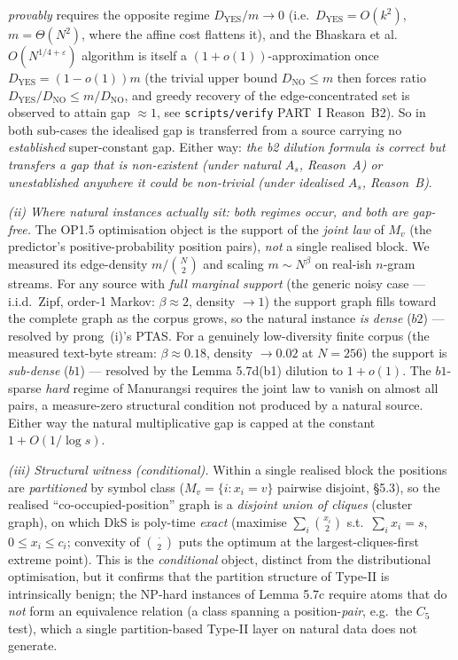 \documentclass[
]{article}
\begin{document}
\emph{provably} requires the opposite regime $D_{\mathrm{YES}}/m \to 0$ (i.e.\
$D_{\mathrm{YES}} = O(k^2)$, $m = \Theta(N^2)$, where the affine cost flattens
it), and the Bhaskara et al.\ $O(N^{1/4+\varepsilon})$ algorithm is itself a
$(1+o(1))$-approximation once $D_{\mathrm{YES}} = (1-o(1))m$ (the trivial
upper bound $D_{\mathrm{NO}} \le m$ then forces ratio $D_{\mathrm{YES}}/
D_{\mathrm{NO}} \le m/D_{\mathrm{NO}}$, and greedy recovery of the
edge-concentrated set is observed to attain gap $\approx 1$, see
\texttt{scripts/verify} PART~I Reason~B2). So in both sub-cases the idealised
gap is transferred from a source carrying no \emph{established} super-constant
gap. Either way: \emph{the b2 dilution formula is correct but transfers a gap
that is non-existent (under natural $A_s$, Reason~A) or unestablished
anywhere it could be non-trivial (under idealised $A_s$, Reason~B)}.

\emph{(ii) Where natural instances actually sit: both regimes occur, and
both are gap-free.} The OP1.5 optimisation object is the support of the
\emph{joint law} of $M_v$ (the predictor's positive-probability position
pairs), \emph{not} a single realised block. We measured its edge-density
$m/\binom{N}{2}$ and scaling $m \sim N^\beta$ on real-ish $n$-gram streams.
For any source with \emph{full marginal support} (the generic noisy case ---
i.i.d.\ Zipf, order-1 Markov: $\beta \approx 2$, density $\to 1$) the support
graph fills toward the complete graph as the corpus grows, so the natural
instance \emph{is dense} ($b2$) --- resolved by prong~(i)'s PTAS. For a
genuinely low-diversity finite corpus (the measured text-byte stream: $\beta
\approx 0.18$, density $\to 0.02$ at $N = 256$) the support is \emph{sub-dense}
($b1$) --- resolved by the Lemma 5.7d(b1) dilution to $1 + o(1)$. The
$b1$-sparse \emph{hard} regime of Manurangsi requires the joint law to vanish
on almost all pairs, a measure-zero structural condition not produced by a
natural source. Either way the natural multiplicative gap is capped at the
constant $1 + O(1/\log s)$.

\emph{(iii) Structural witness (conditional).} Within a single realised
block the positions are \emph{partitioned} by symbol class ($M_v = \{i : x_i
= v\}$ pairwise disjoint, §5.3), so the realised ``co-occupied-position''
graph is a \emph{disjoint union of cliques} (cluster graph), on which DkS is
poly-time \emph{exact} (maximise $\sum_i \binom{x_i}{2}$ s.t.\ $\sum_i x_i =
s$, $0 \le x_i \le c_i$; convexity of $\binom{\cdot}{2}$ puts the optimum at
the largest-cliques-first extreme point). This is the \emph{conditional}
object, distinct from the distributional optimisation, but it confirms that
the partition structure of Type-II is intrinsically benign; the NP-hard
instances of Lemma 5.7c require atoms that do \emph{not} form an equivalence
relation (a class spanning a position-\emph{pair}, e.g.\ the $C_5$ test),
which a single partition-based Type-II layer on natural data does not
generate.
\end{document}
